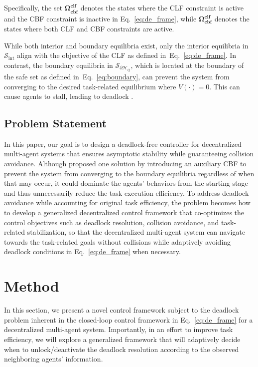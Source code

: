 \documentclass[letterpaper, 10 pt, conference]{ieeeconf}
\theoremstyle{plain}
\begin{document}
Specifically, the set ${\boldsymbol{\Omega }_{\overline {\mathbf {cbf}}}^{\mathbf {clf}}}$ denotes the states where the CLF constraint is active and the CBF constraint is inactive in Eq.~\eqref{eq:de_frame}, while ${\mathbf {\Omega _{cbf}^{clf}}}$ denotes the states where both CLF and CBF constraints are active.


While both interior and boundary equilibria exist, only the interior equilibria in $\mathcal{S}_{\mathrm{int}}$ align with the objective of the CLF as defined in~Eq.~\eqref{eq:de_frame}. In contrast, the boundary equilibria in $\mathcal{S}_{\partial \mathcal{H}_{ij}}$, which is located at the boundary of the safe set as defined in~Eq.~\eqref{eq:boundary},
can prevent the system from converging to the desired task-related equilibrium where $V(\cdot)=0$. This can cause agents to stall, leading to deadlock \cite{grover2023before}.




\subsection{Problem Statement}



In this paper, our goal is to design a deadlock-free controller for decentralized multi-agent systems that ensures asymptotic stability while guaranteeing collision avoidance. 
Although \cite{reis2020control} proposed one solution by introducing an auxiliary CBF to prevent the system from converging to the boundary equilibria
regardless of when that may occur, it could
dominate the agents’ behaviors from the starting stage and thus unnecessarily reduce the task execution efficiency.
To address deadlock avoidance while accounting for original task efficiency,
the problem becomes how to develop a generalized decentralized control framework that co-optimizes the control objectives such as deadlock resolution, collision avoidance, and task-related stabilization, so that the decentralized multi-agent system can navigate towards the task-related goals without collisions while adaptively avoiding deadlock conditions in Eq.~\eqref{eq:de_frame} when necessary.  


\section{Method}
In this section, we present a novel control framework subject to the deadlock problem inherent in the closed-loop control framework in Eq.~\eqref{eq:de_frame} for a decentralized multi-agent system. Importantly, in an effort to improve task efficiency, we will explore a generalized framework that will adaptively decide when to unlock/deactivate the deadlock resolution according to the observed neighboring agents' information.
\end{document}
